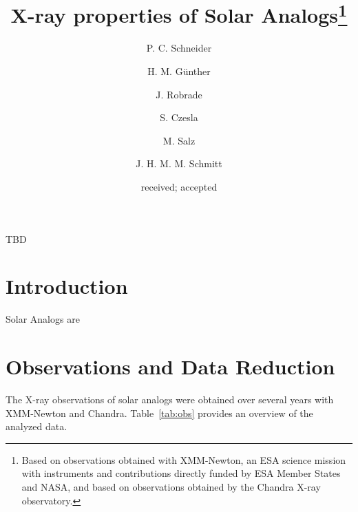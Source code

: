 \documentclass[oldversion]{aa}
\begin{document}
 

\title{X-ray properties of Solar Analogs\thanks{Based on observations obtained with XMM-Newton, an ESA science mission with instruments and contributions directly funded by ESA Member States and NASA, and based on observations obtained by the Chandra X-ray observatory.}}


   \author{P. C. Schneider
          \and
          H. M. G\"unther
          \and
          J. Robrade
          \and
          S. Czesla
          \and
          M. Salz
          \and
          J. H. M. M. Schmitt
          }

     
               
   \date{received; accepted}

 
  \abstract
   {
TBD
     }


   \maketitle
   
\section{Introduction}
Solar Analogs are



\section{Observations and Data Reduction}
The X-ray observations of solar analogs were obtained over several years with XMM-Newton and Chandra. Table~\ref{tab:obs} provides an overview of the analyzed data.


 

\end{document}
